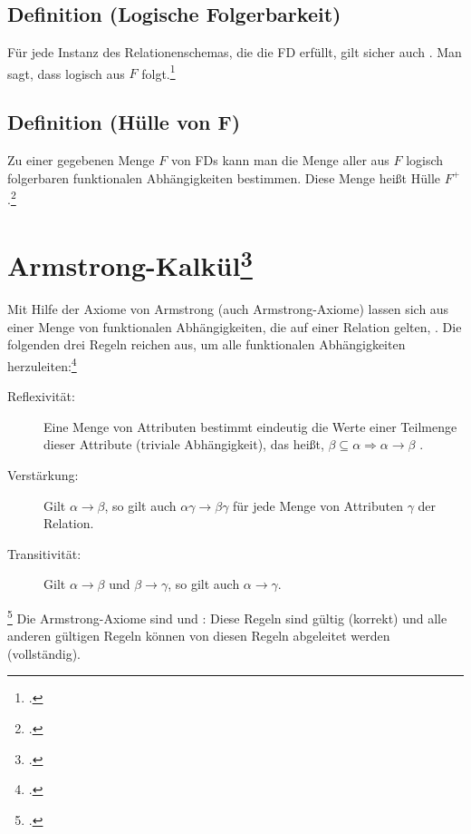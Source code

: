 \documentclass{bschlangaul-theorie}
\begin{document}
%

\subsection{Definition (Logische Folgerbarkeit)}

Für jede Instanz des Relationenschemas, die die FD  erfüllt, gilt sicher auch
. Man sagt, dass 
logisch aus $F$ folgt.\footcite[Seite 171]{winter}

%

\subsection{Definition (Hülle von F)}

Zu einer gegebenen Menge $F$ von FDs kann man die Menge aller aus $F$
logisch folgerbaren funktionalen Abhängigkeiten bestimmen. Diese Menge
heißt Hülle $F^+$.\footcite[Seite 171]{winter}

%

\section{Armstrong-Kalkül\footcite[Axiome von Armstrong]{wiki:funktionale-abhängigkeit}}

Mit Hilfe der Axiome von Armstrong (auch Armstrong-Axiome) lassen sich
aus einer Menge von funktionalen Abhängigkeiten, die auf einer Relation
gelten, .
Die folgenden drei Regeln reichen aus, um alle funktionalen
Abhängigkeiten herzuleiten:\footcite[Seite 14]{db:fs:4}

%


\begin{description}
\item[Reflexivität:]
%
Eine Menge von Attributen bestimmt eindeutig die Werte einer Teilmenge
dieser Attribute (triviale Abhängigkeit), das heißt,
$\beta \subseteq \alpha \Rightarrow \alpha \rightarrow \beta$ .

\item[Verstärkung:]
%
Gilt
$\alpha \rightarrow \beta$, so gilt auch
$\alpha \gamma \rightarrow \beta \gamma$
für jede Menge von Attributen
$\gamma$ der
Relation.

\item[Transitivität:]
%
Gilt
$\alpha \rightarrow \beta$
und
$\beta \rightarrow \gamma$,
so gilt auch
$\alpha \rightarrow \gamma$.
\end{description}
\footcite[Axiome von Armstrong]{wiki:funktionale-abhängigkeit}
Die Armstrong-Axiome sind  und : Diese
Regeln sind gültig (korrekt) und alle anderen gültigen Regeln können von
diesen Regeln abgeleitet werden (vollständig).
\end{document}

